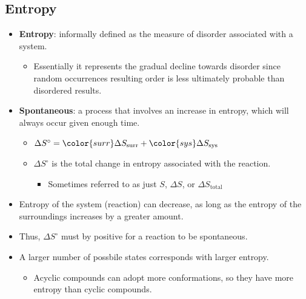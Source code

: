 \documentclass[12pt,a4paper]{article}
\begin{document}
\subsection{Entropy}
\begin{itemize}
    \item \textbf{Entropy}: informally defined as the measure of disorder associated with a system.
        \begin{itemize}
            \item Essentially it represents the gradual decline towards disorder since random occurrences resulting order is less ultimately probable than disordered results.
        \end{itemize}
    \item \textbf{Spontaneous}: a process that involves an {\color{o-Sun}increase in entropy}, which will always occur given enough time.
        \begin{itemize}
            \item \(\Delta S^\circ = {\color{surr}\Delta S_{\text{surr}}} + {\color{sys}\Delta S_{\text{sys}}}\) 
            \item \(\Delta S^\circ\) is the total change in entropy associated with the reaction. 
                \begin{itemize}
                    \item Sometimes referred to as just \(S\), \(\Delta S\),  or \(\Delta S_{\text{total}}\)
                \end{itemize}
        \end{itemize}
    \item Entropy of the {\color{sys}system (reaction)} can decrease, as long as the entropy of the {\color{surr}surroundings} increases by a greater amount.
    \item Thus, {\color{o-Sun}\(\Delta S^\circ\) must by {\color{pos}positive} for a reaction to be spontaneous}.
    \item A larger number of possbile states corresponds with larger entropy.
        \begin{itemize}
            \item Acyclic compounds can adopt more conformations, so they have more entropy than cyclic compounds.
        \end{itemize}
\end{itemize}
\end{document}
